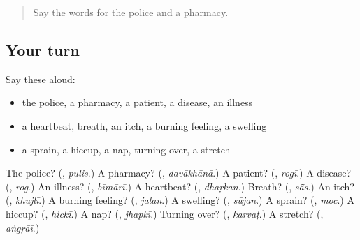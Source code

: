 \label{lesson:HI-R275-second-pass-words-from-chapters-273-275}



\begin{quote}
Say the words for the police and a pharmacy.
\end{quote}

\subsection*{Your turn}
Say these aloud:

\begin{itemize}
\raggedright
  \item the police, a pharmacy, a patient, a disease, an illness
  \item a heartbeat, breath, an itch, a burning feeling, a swelling
  \item a sprain, a hiccup, a nap, turning over, a stretch
\end{itemize}

\begin{tcolorbox}[breakable,colback=teal!4,colframe=teal!35!black,title={Before you move on}]
The police? (\textbf{}, \emph{pulis}.) A pharmacy? (\textbf{}, \emph{davākhānā}.) A patient? (\textbf{}, \emph{rogī}.) A disease? (\textbf{}, \emph{rog}.) An illness? (\textbf{}, \emph{bīmārī}.) A heartbeat? (\textbf{}, \emph{dhaṛkan}.) Breath? (\textbf{}, \emph{sā̃s}.) An itch? (\textbf{}, \emph{khujlī}.) A burning feeling? (\textbf{}, \emph{jalan}.) A swelling? (\textbf{}, \emph{sūjan}.) A sprain? (\textbf{}, \emph{moc}.) A hiccup? (\textbf{}, \emph{hickī}.) A nap? (\textbf{}, \emph{jhapkī}.) Turning over? (\textbf{}, \emph{karvaṭ}.) A stretch? (\textbf{}, \emph{aṅgṛāī}.)
\end{tcolorbox}
